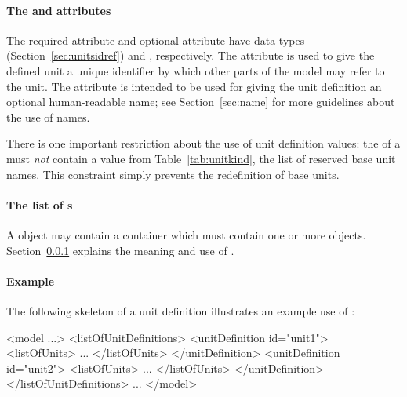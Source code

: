 \paragraph{The  and  attributes}

The required attribute  and optional attribute
 have data types 
(Section~\ref{sec:unitsidref}) and ,
respectively.  The  attribute is used to give the
defined unit a unique identifier by which other parts of the model
may refer to the unit.  The  attribute is intended to
be used for giving the unit definition an optional human-readable
name; see Section~\ref{sec:name} for more guidelines about the use
of names.

There is one important restriction about the use of unit
definition  values: the  of a \UnitDefinition
must \emph{not} contain a value from Table~\ref{tab:unitkind}, the
list of reserved base unit names.  This constraint simply prevents
the redefinition of base units.


\paragraph{The list of s}
\label{sec:listofunits}

A \UnitDefinition object may contain a \ListOfUnits container which must
contain one or more \Unit objects. Section~\ref{sec:unit-structure} explains
the meaning and use of \Unit.   

\paragraph{Example}

The following skeleton of a unit definition illustrates an example
use of \UnitDefinition:

\begin{example}
<model ...>
    <listOfUnitDefinitions>
        <unitDefinition id="unit1">
            <listOfUnits>
                ...
            </listOfUnits>
        </unitDefinition>
        <unitDefinition id="unit2">
            <listOfUnits>
                ...
            </listOfUnits>
        </unitDefinition>
    </listOfUnitDefinitions>
    ...
</model>
\end{example}


\subsubsection{}
\label{sec:unit-structure}

